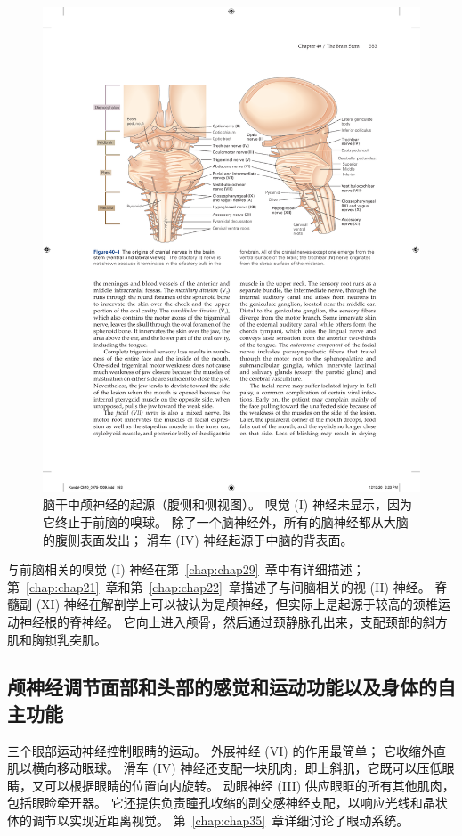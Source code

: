 \begin{figure}[htbp]
	\centering
	\includegraphics[width=0.95\linewidth]{chap40/fig_40_1}
	\caption{脑干中颅神经的起源（腹侧和侧视图）。 嗅觉 (I) 神经未显示，因为它终止于前脑的嗅球。 除了一个脑神经外，所有的脑神经都从大脑的腹侧表面发出； 滑车 (IV) 神经起源于中脑的背表面。}
	\label{fig:40_1}
\end{figure}


与前脑相关的嗅觉 (I) 神经在第~\ref{chap:chap29}~章中有详细描述；
第~\ref{chap:chap21}~章和第~\ref{chap:chap22}~章描述了与间脑相关的视 (II) 神经。
脊髓副 (XI) 神经在解剖学上可以被认为是颅神经，但实际上是起源于较高的颈椎运动神经根的脊神经。
它向上进入颅骨，然后通过颈静脉孔出来，支配颈部的斜方肌和胸锁乳突肌。



\subsection{颅神经调节面部和头部的感觉和运动功能以及身体的自主功能}

三个眼部运动神经控制眼睛的运动。
外展神经 (VI) 的作用最简单；
它收缩外直肌以横向移动眼球。
滑车 (IV) 神经还支配一块肌肉，即上斜肌，它既可以压低眼睛，又可以根据眼睛的位置向内旋转。
动眼神经 (III) 供应眼眶的所有其他肌肉，包括眼睑牵开器。
它还提供负责瞳孔收缩的副交感神经支配，以响应光线和晶状体的调节以实现近距离视觉。
第~\ref{chap:chap35}~章详细讨论了眼动系统。


